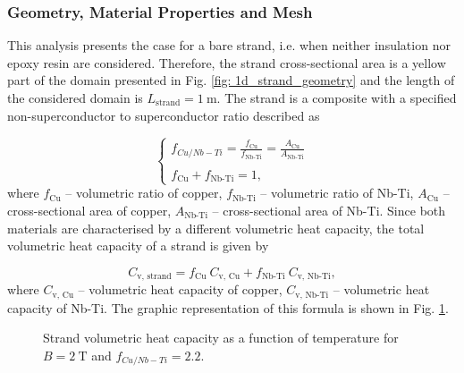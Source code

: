
\subsubsection{Geometry, Material Properties and Mesh}

This analysis presents the case for a bare strand, i.e. when neither insulation nor epoxy resin are considered. Therefore, the strand cross-sectional area is a yellow part of the domain presented in Fig. \ref{fig: 1d_strand_geometry} and the length of the considered domain is $L_\text{strand}=1~\text{m}$. The strand is a composite with a specified non-superconductor to superconductor ratio described as 

\begin{equation}
    \left\{ \begin{array}{ll}
    f_{Cu/Nb-Ti} = \frac{f_\text{Cu}}{f_\text{Nb-Ti}} = \frac{A_\text{Cu}}{A_\text{Nb-Ti}}\\ \\
    f_\text{Cu} + f_\text{Nb-Ti} = 1,
    \end{array} \right.
    \label{eqn: non_super_to_super_ratio}
\end{equation}
where $f_\text{Cu}$ -- volumetric ratio of copper, $f_\text{Nb-Ti}$ -- volumetric ratio of Nb-Ti, $A_\text{Cu}$ -- cross-sectional area of copper, $A_\text{Nb-Ti}$ -- cross-sectional area of Nb-Ti. Since both materials are characterised by a different volumetric heat capacity, the total volumetric heat capacity of a strand is given by

\begin{equation}
    C_\text{v, strand} = f_\text{Cu} ~ C_\text{v, Cu} + f_\text{Nb-Ti} ~ C_\text{v, Nb-Ti},
    \label{eqn: cv_equiv}
\end{equation}
where $C_\text{v, Cu}$ -- volumetric heat capacity of copper, $C_\text{v, Nb-Ti}$ -- volumetric heat capacity of Nb-Ti. The graphic representation of this formula is shown in Fig. \ref{fig:eq_wind_cp}.

\begin{figure}[H]
\centering
    \caption{Strand volumetric heat capacity as a function of temperature for $B=2~\text{T}$ and $f_{Cu/Nb-Ti}=2.2$.}
    \label{fig:eq_wind_cp}
\end{figure}

